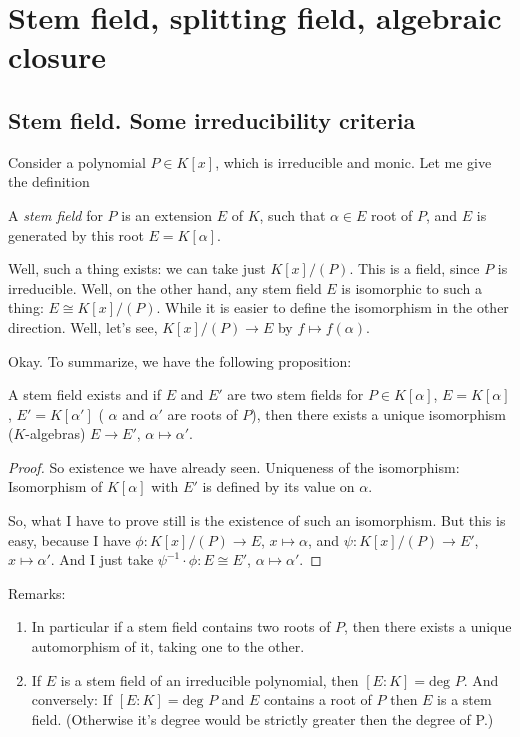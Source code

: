 \chapter{Stem field, splitting field, algebraic closure}

\section{Stem field. Some irreducibility criteria}
Consider a polynomial $P \in K[x]$, which is irreducible and monic. Let me give the definition

\begin{definition}
A \textit{stem field} for $P$ is an extension $E$ of $K$, such that $\alpha\in E$ root of $P$, and $E$ is generated by this root $E=K[\alpha]$.
\end{definition}

Well, such a thing exists: we can take just $K[x]/(P)$. This is a field, since $P$ is irreducible. Well, on the other hand, any stem field $E$ is isomorphic to such a thing: $E\cong K[x]/(P)$. While it is easier to define the isomorphism in the other direction. Well, let's see, $K[x]/(P)\to E$ by $f\mapsto f(\alpha)$. 

Okay. To summarize, we have the following proposition: 
\begin{proposition}
A stem field exists and if $E$ and $E'$ are two stem fields for $P\in K[\alpha]$, $E=K[\alpha]$, $E'=K[\alpha']$ ( $\alpha$ and $\alpha'$ are roots of $P$), then there exists a unique isomorphism  ($K$-algebras) $E\to E'$, $\alpha\mapsto\alpha'$.
\end{proposition}

\begin{proof}
So existence we have already seen. Uniqueness of the isomorphism: Isomorphism of $K[\alpha]$ with $E'$ is defined by its value on $\alpha$.

So, what I have to prove still is the existence of such an isomorphism. But this is easy, because I have $\phi: K[x]/(P)\to E$, $x\mapsto\alpha$, and $\psi: K[x]/(P) \to E'$, $x\mapsto\alpha'$. And I just take $\psi^{-1} \cdot \phi: E\cong E'$, $\alpha \mapsto \alpha'$. 
\end{proof}

Remarks: 
\begin{enumerate}
\item In particular if a stem field contains two roots of $P$, then there exists a unique automorphism of it, taking one to the other. 
\item If $E$ is a stem field of an irreducible polynomial, then $[E:K]=\text{deg }P$. And conversely: If $[E:K]=\text{deg }P$ and $E$ contains a root of $P$ then $E$ is a stem field. (Otherwise it's degree would be strictly greater then the degree of P.)
\end{enumerate}

